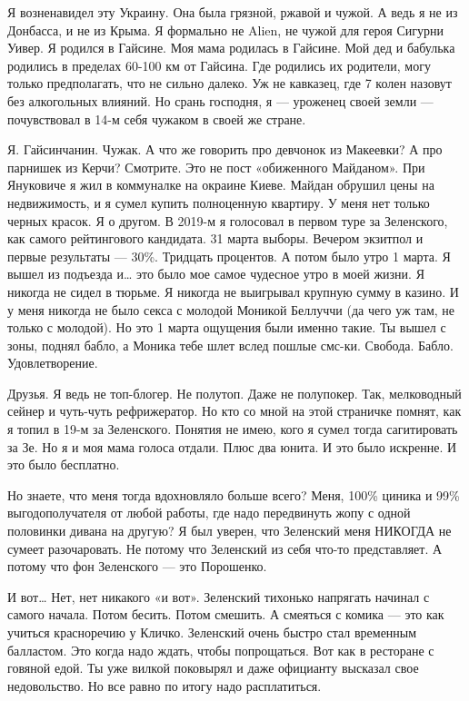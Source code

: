 Я возненавидел эту Украину. Она была грязной, ржавой и чужой. А ведь я не из
Донбасса, и не из Крыма. Я формально не Alien, не чужой для героя Сигурни
Уивер. Я родился в Гайсине. Моя мама родилась в Гайсине. Мой дед и бабулька
родились в пределах 60-100 км от Гайсина. Где родились их родители, могу только
предполагать, что не сильно далеко. Уж не кавказец, где 7 колен назовут без
алкогольных влияний. Но срань господня, я --- уроженец своей земли --- почувствовал
в 14-м себя чужаком в своей же стране.

Я. Гайсинчанин. Чужак. А что же говорить про девчонок из Макеевки? А про
парнишек из Керчи?  Смотрите. Это не пост «обиженного Майданом». При Януковиче
я жил в коммуналке на окраине Киеве. Майдан обрушил цены на недвижимость, и я
сумел купить полноценную квартиру. У меня нет только черных красок. Я о другом.
В 2019-м я голосовал в первом туре за Зеленского, как самого рейтингового
кандидата. 31 марта выборы. Вечером экзитпол и первые результаты --- 30\%.
Тридцать процентов. А потом было утро 1 марта. Я вышел из подъезда и… это было
мое самое чудесное утро в моей жизни. Я никогда не сидел в тюрьме. Я никогда не
выигрывал крупную сумму в казино. И у меня никогда не было секса с молодой
Моникой Беллуччи (да чего уж там, не только с молодой). Но это 1 марта ощущения
были именно такие. Ты вышел с зоны, поднял бабло, а Моника тебе шлет вслед
пошлые смс-ки. Свобода. Бабло. Удовлетворение.

Друзья. Я ведь не топ-блогер. Не полутоп. Даже не полупокер. Так, мелководный сейнер и чуть-чуть рефрижератор. Но кто со мной на этой страничке помнят, как я топил в 19-м за Зеленского. Понятия не имею, кого я сумел тогда сагитировать за Зе. Но я и моя мама голоса отдали. Плюс два юнита. И это было искренне. И это было бесплатно.

Но знаете, что меня тогда вдохновляло больше всего? Меня, 100\% циника и 99\%
выгодополучателя от любой работы, где надо передвинуть жопу с одной половинки
дивана на другую? Я был уверен, что Зеленский меня НИКОГДА не сумеет
разочаровать. Не потому что Зеленский из себя что-то представляет. А потому что
фон Зеленского --- это Порошенко.

И вот… Нет, нет никакого «и вот». Зеленский тихонько напрягать начинал с самого
начала. Потом бесить. Потом смешить. А смеяться с комика --- это как учиться
красноречию у Кличко. Зеленский очень быстро стал временным балластом. Это
когда надо ждать, чтобы попрощаться. Вот как в ресторане с говяной едой. Ты уже
вилкой поковырял и даже официанту высказал свое недовольство. Но все равно по
итогу надо расплатиться.

